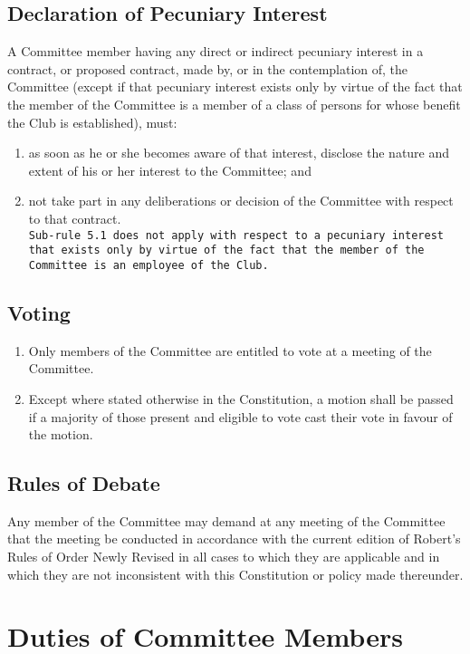\documentclass[11pt]{article} %
\begin{document}
\subsection{Declaration of Pecuniary Interest}
A Committee member having any direct or indirect pecuniary interest in a contract, or proposed contract, made by, or in the contemplation of, the Committee (except if that pecuniary interest exists only by virtue of the fact that the member of the Committee is a member of a class of persons for whose benefit the Club is established), must:
\begin{enumerate}
	\item as soon as he or she becomes aware of that interest, disclose the nature and extent of his or her interest to the Committee; and
	\item not take part in any deliberations or decision of the Committee with respect to that contract.\\
\texttt{Sub-rule 5.1 does not apply with respect to a pecuniary interest that exists only by virtue of the fact that the member of the Committee is an employee of the Club.}
\end{enumerate}

\subsection{Voting}
\begin{enumerate}
	\item Only members of the Committee are entitled to vote at a meeting of the Committee.
	\item Except where stated otherwise in the Constitution, a motion shall be passed if a majority of those present and eligible to vote cast their vote in favour of the motion.
\end{enumerate}

\subsection{Rules of Debate}
Any member of the Committee may demand at any meeting of the Committee that the meeting be conducted in accordance with the current edition of Robert’s Rules of Order Newly Revised in all cases to which they are applicable and in which they are not inconsistent with this Constitution or policy made thereunder.

\section{Duties of Committee Members}
\end{document}

